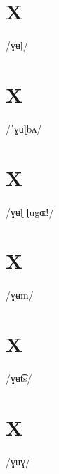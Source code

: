 \documentclass[10pt,a4paper,twoside]{book}
\begin{document}
\section*{X}

\begin{multicols}{3}
 {/ɣʉɭ/} {}
\end{multicols}

\section*{X}

\begin{multicols}{3}
 {/ˈɣʉɭbʌ/} {}
\end{multicols}

\section*{X}

\begin{multicols}{3}
 {/ɣʉɭˈɭugɶǃ/} {}
\end{multicols}

\section*{X}

\begin{multicols}{3}
 {/ɣʉm/} {}
\end{multicols}

\section*{X}

\begin{multicols}{3}
 {/ɣʉt͡s/} {}
\end{multicols}

\section*{X}

\begin{multicols}{3}
 {/ɣʉɣ/} {}
\end{multicols}
\end{document}
